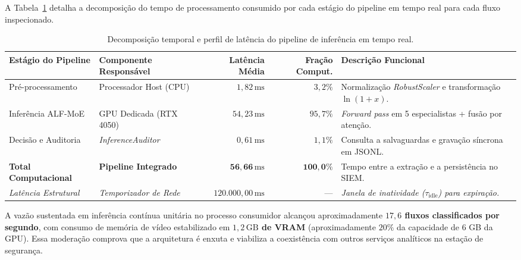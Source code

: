 A Tabela~\ref{tab:decomposicao_latencia_pipeline} detalha a decomposição do tempo de processamento
consumido por cada estágio do pipeline em tempo real para cada fluxo inspecionado.

\begin{table}[htb]
\centering
\caption{Decomposição temporal e perfil de latência do pipeline de inferência em tempo real.}
\label{tab:decomposicao_latencia_pipeline}
\footnotesize
\setlength{\tabcolsep}{4pt}
\begin{tabularx}{\textwidth}{>{\raggedright\arraybackslash}p{3.2cm}
  >{\raggedright\arraybackslash}p{2.6cm} rr >{\raggedright\arraybackslash}X}
\hline
\textbf{Estágio do Pipeline} & \textbf{Componente Responsável} & \textbf{Latência Média} &
  \textbf{Fração Comput.} & \textbf{Descrição Funcional} \\
\hline
Pré-processamento & Processador Host (CPU) & $1{,}82\,\mathrm{ms}$ & $3{,}2\%$ &
  Normalização \emph{RobustScaler} e transformação $\ln(1+x)$. \\
Inferência ALF-MoE & GPU Dedicada (RTX 4050) & $54{,}23\,\mathrm{ms}$ & $95{,}7\%$ &
  \emph{Forward pass} em 5 especialistas + fusão por atenção. \\
Decisão e Auditoria & \emph{InferenceAuditor} & $0{,}61\,\mathrm{ms}$ & $1{,}1\%$ &
  Consulta a salvaguardas e gravação síncrona em JSONL. \\
\hline
\textbf{Total Computacional} & \textbf{Pipeline Integrado} & $\mathbf{56{,}66\,\mathrm{ms}}$ &
  $\mathbf{100{,}0\%}$ & Tempo entre a extração e a persistência no SIEM. \\
\hline
\emph{Latência Estrutural} & \emph{Temporizador de Rede} & $120.000{,}00\,\mathrm{ms}$ & --- &
  \emph{Janela de inatividade ($\tau_{\mathrm{idle}}$) para expiração.} \\
\hline
\end{tabularx}

\end{table}

A vazão sustentada em inferência contínua unitária no processo consumidor alcançou aproximadamente
\textbf{$17{,}6$ fluxos classificados por segundo}, com consumo de memória de vídeo estabilizado em
\textbf{$1{,}2\,\mathrm{GB}$ de VRAM} (aproximadamente $20\%$ da capacidade de 6 GB da GPU). Essa
moderação comprova que a arquitetura é enxuta e viabiliza a coexistência com outros serviços analíticos
na estação de segurança.

